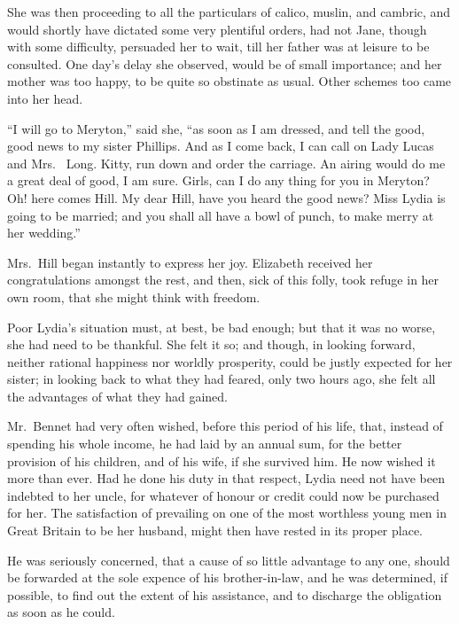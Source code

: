 She was then proceeding to all the particulars of calico,
muslin, and cambric, and would shortly have dictated
some very plentiful orders, had not Jane, though with
some difficulty, persuaded her to wait, till her father was
at leisure to be consulted. One day’s delay she observed,
would be of small importance; and her mother was too
happy, to be quite so obstinate as usual. Other schemes
too came into her head.

“I will go to Meryton,” said she, “as soon as I am
dressed, and tell the good, good news to my sister Phillips.
And as I come back, I can call on Lady Lucas and Mrs.\ %
Long. Kitty, run down and order the carriage. An
airing would do me a great deal of good, I am sure. Girls,
can I do any thing for you in Meryton? Oh! here comes
Hill. My dear Hill, have you heard the good news? Miss
Lydia is going to be married; and you shall all have a
bowl of punch, to make merry at her wedding.”

Mrs.\ Hill began instantly to express her joy. Elizabeth
received her congratulations amongst the rest, and then,
sick of this folly, took refuge in her own room, that she
might think with freedom.

Poor Lydia’s situation must, at best, be bad enough;
but that it was no worse, she had need to be thankful.
She felt it so; and though, in looking forward, neither
rational happiness nor worldly prosperity, could be justly
expected for her sister; in looking back to what they
had feared, only two hours ago, she felt all the advantages
of what they had gained.


Mr.\ Bennet had very often wished, before this period
of his life, that, instead of spending his whole income, he
had laid by an annual sum, for the better provision of
his children, and of his wife, if she survived him. He now
wished it more than ever. Had he done his duty in that
respect, Lydia need not have been indebted to her uncle,
for whatever of honour or credit could now be purchased
for her. The satisfaction of prevailing on one of the most
worthless young men in Great Britain to be her husband,
might then have rested in its proper place.

He was seriously concerned, that a cause of so little
advantage to any one, should be forwarded at the sole
expence of his brother-in-law, and he was determined,
if possible, to find out the extent of his assistance, and to
discharge the obligation as soon as he could.

